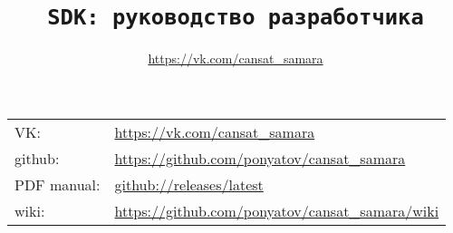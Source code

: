 

\title{\LARGE{\texttt{SDK: руководство разработчика}}}
\author{\url{https://vk.com/cansat_samara}}



\maketitle

\tableofcontents
\secdown

\clearpage
{}

\noindent
\begin{tabular}{l l}
VK: &\url{https://vk.com/cansat_samara}\\
github: &\url{https://github.com/ponyatov/cansat_samara}\\
PDF manual: &\href{https://github.com/ponyatov/cansat_samara/releases/latest}{github://releases/latest} \\
wiki: &\url{https://github.com/ponyatov/cansat_samara/wiki}\\
\end{tabular}







